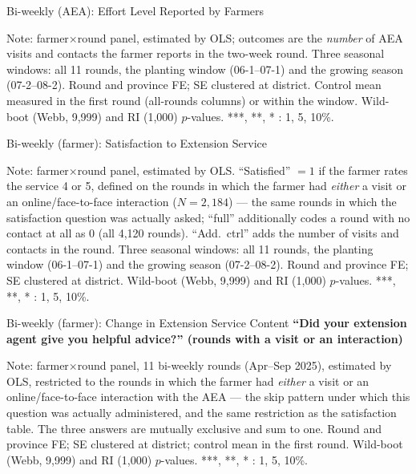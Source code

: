 \documentclass[aspectratio=169]{beamer}
\newcommand{\notefont}{\fontsize{5pt}{6pt}\selectfont}
\begin{document}
\begin{frame}{Bi-weekly (AEA): Effort Level Reported by Farmers}
	\centering
	\begin{minipage}{0.94\textwidth}
		\notefont
		Note: farmer$\times$round panel, estimated by OLS; outcomes are the \emph{number} of AEA
		visits and contacts the farmer reports in the two-week round. Three seasonal windows: all 11 rounds, the
		planting window (06-1--07-1) and the growing season (07-2--08-2).
		Round and province FE; SE clustered at district. Control mean measured in the first round
		(all-rounds columns) or within the window. Wild-boot (Webb, 9{,}999) and RI (1{,}000)
		$p$-values. ***, **, * : 1, 5, 10\%.
	\end{minipage}
\end{frame}

\begin{frame}{Bi-weekly (farmer): Satisfaction to Extension Service}
	\centering
	\begin{minipage}{0.94\textwidth}
		\notefont
		Note: farmer$\times$round panel, estimated by OLS. ``Satisfied'' $=1$ if the farmer rates
		the service 4 or 5, defined on the rounds in which the farmer had \emph{either} a visit or
		an online/face-to-face interaction ($N=2{,}184$) --- the same rounds in which the
		satisfaction question was actually asked; ``full'' additionally codes a round with no
		contact at all as 0 (all 4{,}120 rounds). ``Add.\ ctrl'' adds the number of visits and
		contacts in the round. Three seasonal
		windows: all 11 rounds, the planting window (06-1--07-1) and the growing season
		(07-2--08-2). Round and province FE; SE clustered at district. Wild-boot (Webb, 9{,}999)
		and RI (1{,}000) $p$-values. ***, **, * : 1, 5, 10\%.
	\end{minipage}
\end{frame}

\begin{frame}{Bi-weekly (farmer): Change in Extension Service Content}
	\centering
	{\small\textbf{``Did your extension agent give you helpful advice?'' (rounds with a visit or an interaction)}}\\[3pt]
	\begin{minipage}{0.94\textwidth}
		\notefont
		Note: farmer$\times$round panel, 11 bi-weekly rounds (Apr--Sep 2025), estimated by OLS,
		restricted to the rounds in which the farmer had \emph{either} a visit or an
		online/face-to-face interaction with the AEA --- the skip pattern under which this
		question was actually administered, and the same restriction as the satisfaction table.
		The three answers are mutually exclusive and sum to one.
		Round and province FE; SE clustered at district; control mean in the first
		round. Wild-boot (Webb, 9{,}999) and RI (1{,}000) $p$-values.
		***, **, * : 1, 5, 10\%.
	\end{minipage}
\end{frame}
\end{document}
